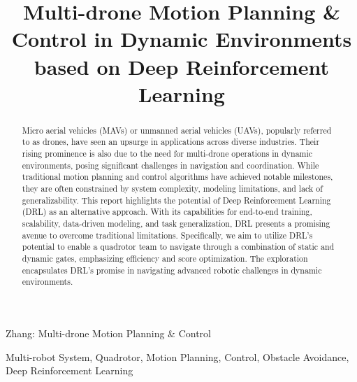 \documentclass[letterpaper,journal,twoside]{IEEEtran}
\begin{document}
\title{Multi-drone Motion Planning \& Control in Dynamic Environments based on Deep Reinforcement Learning}

\author{
}

\maketitle

\begingroup
\renewcommand\thefootnote{}
\endgroup

%
{Zhang: Multi-drone Motion Planning \& Control}



\begin{abstract}
  Micro aerial vehicles (MAVs) or unmanned aerial vehicles (UAVs), popularly referred to as drones, have seen an upsurge in applications across diverse industries. Their rising prominence is also due to the need for multi-drone operations in dynamic environments, posing significant challenges in navigation and coordination. While traditional motion planning and control algorithms have achieved notable milestones, they are often constrained by system complexity, modeling limitations, and lack of generalizability. This report highlights the potential of Deep Reinforcement Learning (DRL) as an alternative approach. With its capabilities for end-to-end training, scalability, data-driven modeling, and task generalization, DRL presents a promising avenue to overcome traditional limitations. Specifically, we aim to utilize DRL's potential to enable a quadrotor team to navigate through a combination of static and dynamic gates, emphasizing efficiency and score optimization. The exploration encapsulates DRL's promise in navigating advanced robotic challenges in dynamic environments.
\end{abstract}

\begin{IEEEkeywords}
  Multi-robot System, Quadrotor, Motion Planning, Control, 
  Obstacle Avoidance, Deep Reinforcement Learning
\end{IEEEkeywords}
\end{document}
